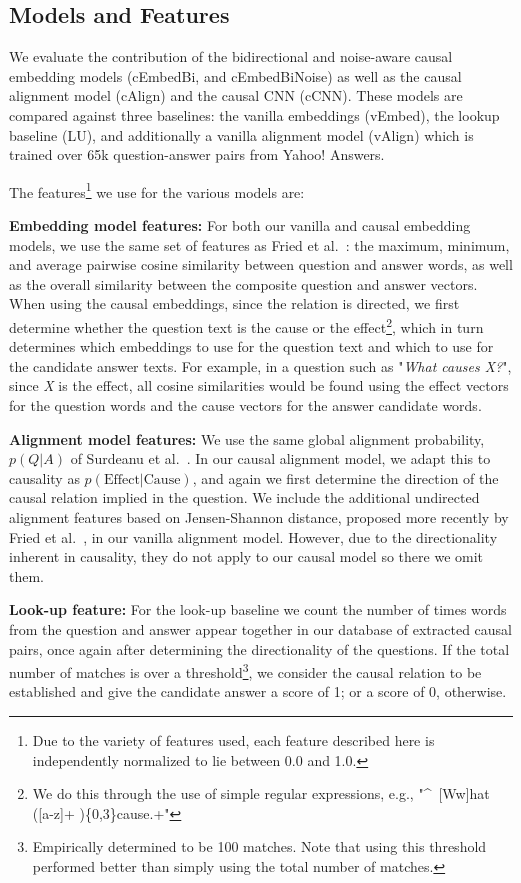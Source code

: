 \subsection{Models and Features}

We evaluate the contribution of the bidirectional and noise-aware causal embedding models (cEmbedBi, and cEmbedBiNoise) as well as the causal alignment model (cAlign) and the causal CNN (cCNN).  These models are compared against three baselines: the vanilla embeddings (vEmbed), the lookup baseline (LU), and additionally a vanilla alignment model (vAlign) which is trained over 65k question-answer pairs from Yahoo! Answers.

The features\footnote{Due to the variety of features used, each feature described here is independently normalized to lie between 0.0 and 1.0.} we use for the various models are:

{ \flushleft \textbf{Embedding model features:}}
For both our vanilla and causal embedding models, we use the same set of features as 
Fried et al.~\citeyear{fried2015higher}: the maximum, minimum, and average pairwise cosine similarity between question and answer words, as well as the overall similarity between the composite question and answer vectors.  
When using the causal embeddings, since the relation is directed, we first determine whether the question text is the cause or the effect\footnote{We do this through the use of simple regular expressions, e.g., "\^~[Ww]hat ([a-z]+ )\{0,3\}cause.+"}, which in turn determines which embeddings to use for the question text and which to use for the candidate answer texts.  For example, in a question such as "\emph{What causes X?}", since \emph{X} is the effect, all cosine similarities would be found using the effect vectors for the question words and the cause vectors for the answer candidate words. 

{\flushleft \textbf{Alignment model features:}} We use the same global alignment probability, $p(Q|A)$ of Surdeanu et al.~\citeyear{Surdeanu:11}. In our causal alignment model, we adapt this to causality as $p(\text{Effect}|\text{Cause})$, and again we first determine the direction of the causal relation implied in the question.  We include the additional undirected alignment features based on Jensen-Shannon distance, proposed more recently by Fried et al.~\citeyear{fried2015higher}, in our vanilla alignment model.  However, due to the directionality inherent in causality, they do not apply to our causal model so there we omit them.

{\flushleft \textbf{Look-up feature:}} For the look-up baseline we count the number of times words from the question and answer appear together in our database of extracted causal pairs, once again after determining the directionality of the questions.  If the total number of matches is over a threshold\footnote{Empirically determined to be 100 matches.  Note that using this threshold performed better than simply using the total number of matches.}, we consider the causal relation to be established and give the candidate answer a score of 1; or a score of 0, otherwise.
